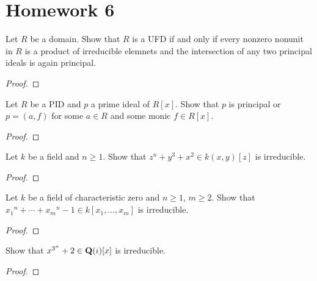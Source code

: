 \chapter{Homework 6}
\begin{problem}
Let $R$ be a domain. Show that $R$ is a UFD if and only if every nonzero
nonunit in $R$ is a product of irreducible elemnets and the intersection of
any two principal ideals is again principal.
\end{problem}
\begin{proof}
\end{proof}

\begin{problem}
Let $R$ be a PID and $p$ a prime ideal of $R[x]$. Show that $p$ is
principal or $p=(a,f)$ for some $a\in R$ and some monic $f\in R[x]$.
\end{problem}
\begin{proof}
\end{proof}

\begin{problem}
Let $k$ be a field and $n\geq 1$. Show that $z^n+y^3+x^2\in k(x,y)[z]$ is
irreducible.
\end{problem}
\begin{proof}
\end{proof}

\begin{problem}
Let $k$ be a field of characteristic zero and $n\geq 1$, $m\geq 2$. Show
that ${x_1}^n+\dotsb+{x_m}^n-1\in k[x_1,\dotsc,x_m]$ is irreducible.
\end{problem}
\begin{proof}
\end{proof}

\begin{problem}
Show that $x^{3^n}+2\in\mathbf{Q}(i)[x]$ is irreducible.
\end{problem}
\begin{proof}
\end{proof}

